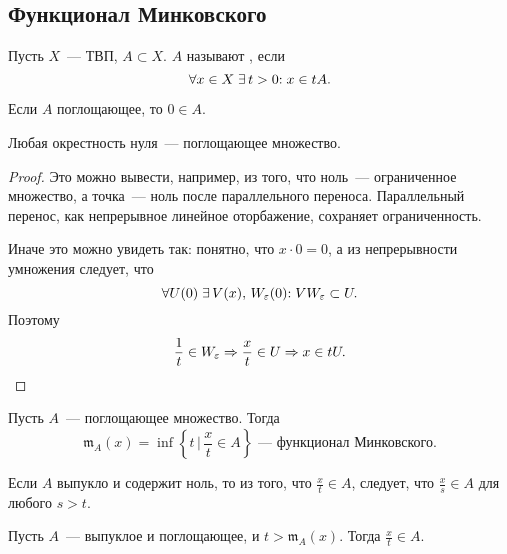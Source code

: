 \documentclass{notes}
\newcommand{\mink}{\mathfrak{m}}
\begin{document}
\subsection{Функционал Минковского}
	
	\begin{de}
		Пусть $X$~--- ТВП, $A \subset X$. $A$ называют , если 
		\[
			\forall x \in X \; \exists \, t > 0 \text{\text{:}} \; x \in tA.
		\]
	\end{de}

	\begin{rem}
		Если $A$ поглощающее, то $0 \in A$.
	\end{rem}

	\begin{st}
		Любая окрестность нуля~--- поглощающее множество.
		\begin{proof}
			Это можно вывести, например, из того, что ноль~--- ограниченное множество, а точка~--- ноль после параллельного переноса. Параллельный перенос, как непрерывное линейное оторбажение, сохраняет ограниченность.

			Иначе это можно увидеть так: понятно, что $x \cdot 0 = 0$, а из непрерывности умножения следует, что
			\[
				\forall U(0) \; \exists \, V(x), \, W_{\varepsilon}(0)\text{\text{:}} \; V W_{\varepsilon} \subset U.
			\]
			Поэтому
			\[
				\dfrac{1}{t} \in W_{\varepsilon} \Rightarrow \dfrac{x}{t} \in U \Rightarrow x \in tU.
			\]
		\end{proof}
	\end{st}

	\begin{de}
		Пусть $A$~--- поглощающее множество. Тогда 
		\[
			\mink_A(x) = \inf \left\{t \, \big| \, \dfrac{x}{t} \in A\right\} \text{~--- функционал Минковского.}
		\]
	\end{de}

	\begin{rem}
		Если $A$ выпукло и содержит ноль, то из того, что $\tfrac{x}{t} \in A$, следует, что $\tfrac{x}{s} \in A$ для любого $s > t$.
	\end{rem}

	\begin{st}
		Пусть $A$~--- выпуклое и поглощающее, и $t > \mink_A(x)$. Тогда $\tfrac{x}{t} \in A$.
	\end{st}
\end{document}
